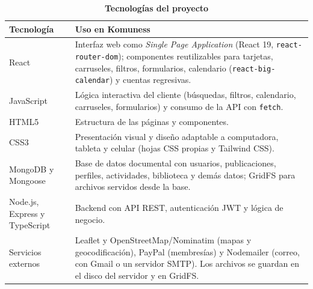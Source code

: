 \begin{table}[H]
\centering
\small
\begin{tabular}{|p{3.3cm}|p{11.5cm}|}
\hline
\textbf{Tecnología} & \textbf{Uso en Komuness} \\
\hline
React \cite{reactjs2024} & Interfaz web como \textit{Single Page Application} (React 19, \texttt{react-router-dom}); componentes reutilizables para tarjetas, carruseles, filtros, formularios, calendario (\texttt{react-big-calendar}) y cuentas regresivas. \\
\hline
JavaScript \cite{mdnjs2026} & Lógica interactiva del cliente (búsquedas, filtros, calendario, carruseles, formularios) y consumo de la API con \texttt{fetch}. \\
\hline
HTML5 \cite{mdnhtml2026} & Estructura de las páginas y componentes. \\
\hline
CSS3 \cite{mdncss2026} & Presentación visual y diseño adaptable a computadora, tableta y celular (hojas CSS propias y Tailwind CSS). \\
\hline
MongoDB \cite{mongodb2026} y Mongoose \cite{mongoosejs2024} & Base de datos documental con usuarios, publicaciones, perfiles, actividades, biblioteca y demás datos; GridFS para archivos servidos desde la base. \\
\hline
Node.js, Express \cite{expressjs2024} y TypeScript & Backend con API REST, autenticación JWT \cite{jwt2015} y lógica de negocio. \\
\hline
Servicios externos & Leaflet y OpenStreetMap/Nominatim (mapas y geocodificación), PayPal \cite{paypaldev2024} (membresías) y Nodemailer (correo, con Gmail o un servidor SMTP). Los archivos se guardan en el disco del servidor y en GridFS. \\
\hline
\end{tabular}
\caption{\textbf{Tecnologías del proyecto}}
\label{tab:tecnologias}
\end{table}

